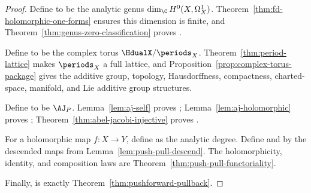 \begin{proof}
Define  to be the analytic genus
\(\dim_{\C}H^{0}(X,\Omega^{1}_{X})\). Theorem~\ref{thm:fd-holomorphic-one-forms}
ensures this dimension is finite, and Theorem~\ref{thm:genus-zero-classification}
proves .

Define  to be the complex torus
\(\HdualX/\periods_X\). Theorem~\ref{thm:period-lattice} makes
\(\periods_X\) a full lattice, and Proposition~\ref{prop:complex-torus-package}
gives the additive group, topology, Hausdorffness, compactness, charted-space,
manifold, and Lie additive group structures.

Define  to be \(\AJ_P\). Lemma~\ref{lem:aj-self}
proves ; Lemma~\ref{lem:aj-holomorphic} proves
; Theorem~\ref{thm:abel-jacobi-injective} proves
.

For a holomorphic map \(f:X\to Y\), define  as
the analytic degree. Define  and
 by the descended maps from
Lemma~\ref{lem:push-pull-descend}. The holomorphicity, identity, and
composition laws are Theorem~\ref{thm:push-pull-functoriality}.

Finally,  is exactly
Theorem~\ref{thm:pushforward-pullback}.
\end{proof}

